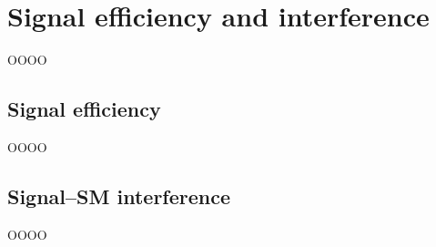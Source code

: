 \chapter{Signal efficiency and interference}
\label{app:appendix-2}

OOOO

\section{Signal efficiency}
\label{heading:Appendix-Appendix2-2}

OOOO

\section{Signal--SM interference}
\label{heading:Appendix-Appendix2-3}

OOOO

